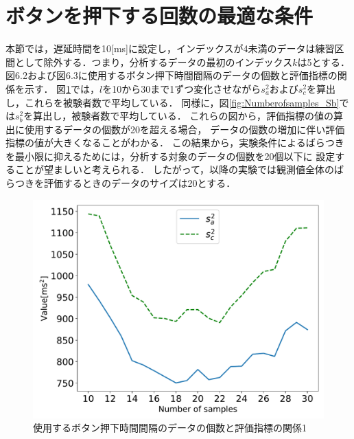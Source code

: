 \section{ボタンを押下する回数の最適な条件}
本節では，遅延時間を10[ms]に設定し，インデックスが4未満のデータは練習区間として除外する．つまり，分析するデータの最初のインデックス$k$は5とする．
図6.2および図6.3に使用するボタン押下時間間隔のデータの個数と評価指標の関係を示す．
図\ref{fig:NumberofSamples_Sa_Sc}では，$l$を10から30まで1ずつ変化させながら$s^2_{a}$および$s^2_{c}$を算出し，これらを被験者数で平均している．
同様に，図\ref{fig:Numberofsamples_Sb}では$s^2_{b}$を算出し，被験者数で平均している．
これらの図から，評価指標の値の算出に使用するデータの個数が20を超える場合，
データの個数の増加に伴い評価指標の値が大きくなることがわかる．
この結果から，実験条件によるばらつきを最小限に抑えるためには，分析する対象のデータの個数を20個以下に
設定することが望ましいと考えられる．
したがって，以降の実験では観測値全体のばらつきを評価するときのデータのサイズは20とする．
\begin{figure}[tbp]
  \centering
  \includegraphics[scale=0.6]{figures/Yobi/Var/NumberOfSamples_varSaSc.pdf}
  \caption{使用するボタン押下時間間隔のデータの個数と評価指標の関係1}
  \label{fig:NumberofSamples_Sa_Sc}
\end{figure}
